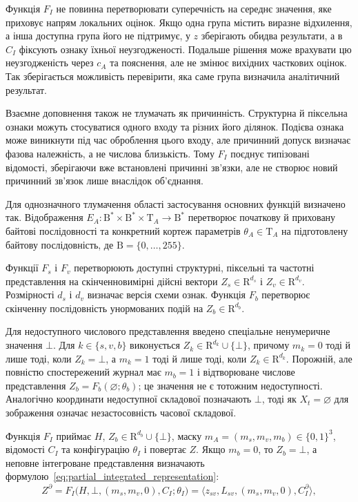 Функція $F_I$ не повинна перетворювати суперечність на середнє значення, яке приховує напрям локальних оцінок. Якщо одна група містить виразне відхилення, а інша доступна група його не підтримує, у $z$ зберігають обидва результати, а в $C_I$ фіксують ознаку їхньої неузгодженості. Подальше рішення може врахувати цю неузгодженість через $c_A$ та пояснення, але не змінює вихідних часткових оцінок. Так зберігається можливість перевірити, яка саме група визначила аналітичний результат.

Взаємне доповнення також не тлумачать як причинність. Структурна й піксельна ознаки можуть стосуватися одного входу та різних його ділянок. Подієва ознака може виникнути під час оброблення цього входу, але причинний допуск визначає фазова належність, а не числова близькість. Тому $F_I$ поєднує типізовані відомості, зберігаючи вже встановлені причинні зв’язки, але не створює новий причинний зв’язок лише внаслідок об’єднання.

Для однозначного тлумачення області застосування основних функцій визначено так. Відображення $E_A:\mathrm{B}^{*}\times\mathrm{B}^{*}\times\mathrm T_A\rightarrow\mathrm{B}^{*}$ перетворює початкову й приховану байтові послідовності та конкретний кортеж параметрів $\theta_A\in\mathrm T_A$ на підготовлену байтову послідовність, де $\mathrm{B}=\{0,\ldots,255\}$.

Функції $F_s$ і $F_v$ перетворюють доступні структурні, піксельні та частотні представлення на скінченновимірні дійсні вектори $Z_s\in\mathrm R^{d_s}$ і $Z_v\in\mathrm R^{d_v}$. Розмірності $d_s$ і $d_v$ визначає версія схеми ознак. Функція $F_b$ перетворює скінченну послідовність унормованих подій на $Z_b\in\mathrm R^{d_b}$.

Для недоступного числового представлення введено спеціальне ненумеричне значення $\bot$. Для $k\in\{s,v,b\}$ виконується $Z_k\in\mathrm R^{d_k}\cup\{\bot\}$, причому $m_k=0$ тоді й лише тоді, коли $Z_k=\bot$, а $m_k=1$ тоді й лише тоді, коли $Z_k\in\mathrm R^{d_k}$. Порожній, але повністю спостережений журнал має $m_b=1$ і відтворюване числове представлення $Z_b=F_b(\varnothing;\theta_b)$; це значення не є тотожним недоступності. Аналогічно координати недоступної складової позначають $\bot$, тоді як $X_t=\varnothing$ для зображення означає незастосовність часової складової.

Функція $F_I$ приймає $H$, $Z_b\in\mathrm R^{d_b}\cup\{\bot\}$, маску $m_A=(m_s,m_v,m_b)\in\{0,1\}^{3}$, відомості $C_I$ та конфігурацію $\theta_I$ і повертає $Z$. Якщо $m_b=0$, то $Z_b=\bot$, а неповне інтегроване представлення визначають формулою~\eqref{eq:partial_integrated_representation}:
\begin{equation}
Z^{\partial}=F_I\bigl(H,\bot,(m_s,m_v,0),C_I;\theta_I\bigr)
=\langle z_{sv},L_{sv},(m_s,m_v,0),C_I^{\partial}\rangle,
\label{eq:partial_integrated_representation}
\end{equation}

